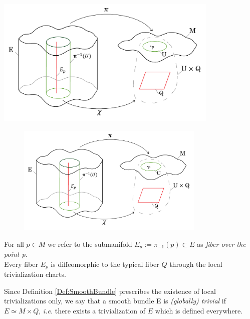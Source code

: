 \documentclass[Main]{subfiles}
\begin{document}
\ifToninus
			\begin{mdframed}
				\centering
  				\includegraphics[width=0.8\textwidth]{Pictures/fiberbundle}		
			\end{mdframed}
\else
			\begin{figure}[h!]
				\centering
  				\includegraphics[width=0.8\textwidth]{Pictures/fiberbundle}		
			\end{figure}
\fi		
			\vspace{2mm}
				For all $p\in M$ we refer to the submanifold $E_{p} := \pi_{-1}(p) \subset E $ as \emph{fiber over the point p}.
				\\
				Every fiber $E_p$ is diffeomorphic to the typical fiber $Q$ through the local trivialization charts.

			\vspace{2mm}
				Since  Definition \ref{Def:SmoothBundle}  prescribes the existence of local trivializations only,
				we say that a smooth bundle E is \emph{(globally) trivial} if $E \simeq M \times Q$, \textit{i.e.} there exists a trivialization of $E$ which is defined everywhere.
			\vspace{3mm}
			
\end{document}

